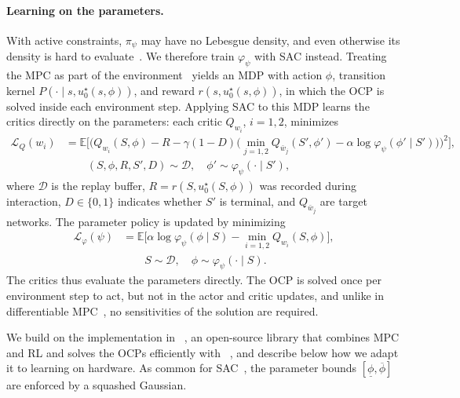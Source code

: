 \documentclass{l4dc2027}
\let\cite\citep
\begin{document}
\paragraph{Learning on the parameters.} With active constraints, $\pi_\psi$ may
have no Lebesgue density, and even otherwise its density is hard to
evaluate~\cite{gros2019towards,gros2021stochastic}. We therefore train $\varphi_\psi$ with \ac{SAC} instead. Treating the \ac{MPC}
as part of the environment~\cite{reiter2025synthesis} yields an MDP with
action $\phi$, transition kernel $P(\cdot\mid s,u_0^\star(s,\phi))$, and reward
$r(s,u_0^\star(s,\phi))$, in which the \ac{OCP} is solved inside each
environment step. Applying \ac{SAC} to this MDP learns the critics directly on the parameters:
each critic $Q_{w_i}$, $i=1,2$, minimizes
\begin{equation}
\begin{aligned}
  \mathcal{L}_Q(w_i) &= \mathbb{E}\Big[\big(Q_{w_i}(S,\phi) - R
    - \gamma(1-D)\big(\min_{j=1,2}Q_{\bar w_j}(S',\phi')
    - \alpha\log\varphi_\psi(\phi'\mid S')\big)\big)^2\Big],\\
  &\qquad (S,\phi,R,S',D)\sim\mathcal{D},\quad \phi'\sim\varphi_\psi(\cdot\mid S'),
\end{aligned}
\label{eq:param-losses}
\end{equation}
where $\mathcal{D}$ is the replay buffer, $R=r(S,u_0^\star(S,\phi))$ was
recorded during interaction, $D\in\{0,1\}$ indicates whether $S'$ is
terminal, and $Q_{\bar w_j}$ are target networks. The
parameter policy is updated by minimizing
\begin{equation*}
\begin{aligned}
  \mathcal{L}_\varphi(\psi) &= \mathbb{E}\big[\alpha\log\varphi_\psi(\phi\mid S)
    - \min_{i=1,2}Q_{w_i}(S,\phi)\big],\\
  &\qquad S\sim\mathcal{D},\quad \phi\sim\varphi_\psi(\cdot\mid S).
\end{aligned}
\end{equation*}
The critics thus evaluate the parameters directly. The
\ac{OCP} is solved once per environment step to act, but not in the actor and
critic updates, and unlike in differentiable
\ac{MPC}~\cite{amos2018diffmpc,romero2024acmpc}, no sensitivities of the
solution are required.

We build on the implementation in
\leapc~\cite{leapc}, an open-source library that combines \ac{MPC} and \ac{RL}
and solves the \acp{OCP} efficiently with \acados~\cite{verschueren2021acados},
and describe below how we adapt it to learning on
hardware. As common for \ac{SAC}~\cite{haarnoja2019sacapps}, the parameter
bounds $[\underline{\phi},\overline{\phi}]$ are enforced by a squashed
Gaussian.
\end{document}
